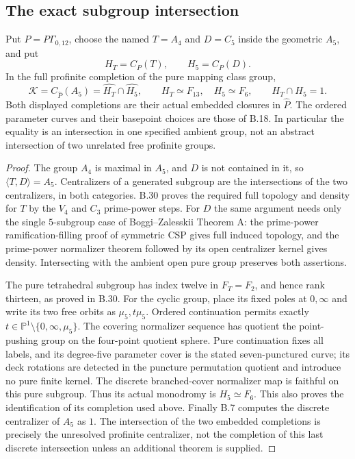 \subsection*{The exact subgroup intersection}

Put $P=P\Gamma_{0,12}$, choose the named $T=A_4$ and $D=C_5$
inside the geometric $A_5$, and put
\[
 H_T=C_P(T),\qquad H_5=C_P(D).
\]
In the full profinite completion of the pure mapping class group,
\[
 \mathcal K=C_{\widehat P}(A_5)
       =\widehat{H_T}\cap\widehat{H_5},\qquad
 H_T\simeq F_{13},\quad H_5\simeq F_6,
 \qquad H_T\cap H_5=1.
\]
Both displayed completions are their actual embedded closures in
$\widehat P$. The ordered parameter curves and their basepoint
choices are those of B.18. In particular the equality is an
intersection in one specified ambient group, not an abstract
intersection of two unrelated free profinite groups.
\begin{proof}
The group $A_4$ is maximal in $A_5$, and $D$ is not contained in it,
so $\langle T,D\rangle=A_5$. Centralizers of a generated subgroup
are the intersections of the two centralizers, in both categories.
B.30 proves the required full topology and density for $T$ by the
$V_4$ and $C_3$ prime-power steps. For $D$ the same argument needs
only the single $5$-subgroup case of Boggi--Zalesskii Theorem A:
the prime-power ramification-filling proof of symmetric CSP gives
full induced topology, and the prime-power normalizer theorem
followed by its open centralizer kernel gives density. Intersecting
with the ambient open pure group preserves both assertions.

The pure tetrahedral subgroup has index twelve in $F_T=F_2$,
and hence rank thirteen, as proved in B.30. For the cyclic group,
place its fixed poles at $0,\infty$ and write its two free orbits as
$\mu_5,t\mu_5$. Ordered continuation permits exactly
$t\in\mathbb P^1\setminus\{0,\infty,\mu_5\}$.
The covering normalizer sequence has quotient the point-pushing
group on the four-point quotient sphere. Pure continuation fixes
all labels, and its degree-five parameter cover is the stated
seven-punctured curve; its deck rotations are detected in the
puncture permutation quotient and introduce no pure finite kernel.
The discrete branched-cover normalizer map is faithful on this
pure subgroup. Thus its actual monodromy is $H_5\simeq F_6$.
This also proves the identification of its completion used above.
Finally B.7 computes the discrete centralizer of $A_5$ as $1$.
The intersection of the two embedded completions is precisely
the unresolved profinite centralizer, not the completion of
this last discrete intersection unless an additional theorem
is supplied.
\end{proof}
